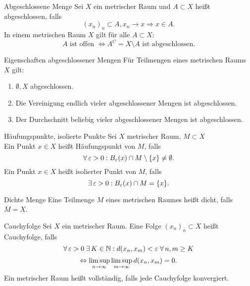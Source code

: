 \documentclass[main.tex]{subfiles}
\begin{document}
\begin{karte}{Abgeschlossene Menge}
    Sei \( X \) ein metrischer Raum und \( A \subset X \) 
    heißt abgeschlossen, falls 
    \[ (x_n)_n \subset A, x_n \rightarrow x 
    \Rightarrow x \in A. \]
    In einem metrischen Raum 
    \( X \) gilt für alle \( A \subset X \):
    \[ A \text{ ist offen } 
    \Leftrightarrow A^C = X \setminus A \text{ ist 
    abgeschlossen}. \]
\end{karte}

\begin{karte}{Eigenschaften abgeschlossener Mengen}
    Für Teilmengen eines metrischen Raums \(X\) gilt: 
    \begin{enumerate}
        \item \( \emptyset, X \) abgeschlossen.
        \item Die Vereinigung endlich vieler abgeschlossener 
        Mengen ist abgeschlossen.
        \item Der Durchschnitt beliebig vieler abgeschlossener 
        Mengen ist abgeschlossen.
    \end{enumerate}
\end{karte}

\begin{karte}{Häufungspunkte, isolierte Punkte}
    Sei \(X\) metrischer Raum, \( M \subset X \) \\
    Ein Punkt \( x \in X \) heißt Häufungspunkt von \(M\),
    falls 
    \[ \forall \varepsilon > 0: 
    B_\varepsilon(x) \cap M \setminus \set{x} 
    \neq \emptyset. \]
    Ein Punkt \( x \in X \) heißt isolierter Punkt 
    von \( M \), falls 
    \[ \exists \varepsilon > 0: B_\varepsilon(x) \cap M 
    = \set{x}. \]
\end{karte}

\begin{karte}{Dichte Menge}
    Eine Teilmenge \(M\) eines metrischen Raumes heißt
    dicht, falls \(\overline{M} = X\).
\end{karte}

\begin{karte}{Cauchyfolge}
    Sei \( X \) ein metrischer Raum. 
    Eine Folge \( (x_n)_n \subset X \) heißt 
    Cauchyfolge, falls
    \[ \forall \varepsilon > 0 \; \exists K \in \N: 
    d(x_n, x_m) < \varepsilon \; \forall n,m \geq K \]
    \[ \Leftrightarrow \limsup\limits_{n\rightarrow\infty} \limsup\limits_{m\rightarrow\infty} 
    d(x_n, x_m) = 0. \]
    Ein metrischer Raum heißt vollständig, falls jede 
    Cauchyfolge konvergiert.
\end{karte}
\end{document}
